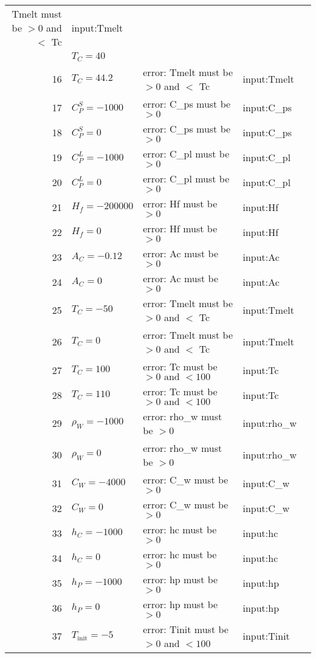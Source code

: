 \documentclass[12pt]{article}
\begin{document}
\begin{center}
\begin{longtable}{ | r | p{4cm} | p{4cm} | p{4cm} | p{4cm} |}
{{	Tmelt must be $> 0$ and $<$ Tc}} & input:Tmelt \\
	& $T_C = 40$ & & \\ \hline
	16 & $T_C = 44.2$ & error: Tmelt must be $> 0$ and $<$ Tc & input:Tmelt \\ \hline
	17 & $C^S_P = -1000$ & error: C\_ps must be $> 0$ &input:C\_{ps} \\ \hline
	18 & $C^S_P = 0$ & error: C\_ps must be $> 0$ &input:C\_{ps} \\ \hline
	19 & $C^L_P = -1000$ & error: C\_pl must be $> 0$ &input:C\_{pl} \\ \hline
	20 & $C^L_P = 0$ & error: C\_pl must be $> 0$ &input:C\_{pl} \\ \hline
	21 & $H_f = -200000$& error: Hf must be $> 0$ & input:Hf \\ \hline
	22 & $H_f = 0$ & error: Hf must be $> 0$ & input:Hf \\ \hline
	23 & $A_C = -0.12$ & error: Ac must be $> 0$ &input:Ac \\ \hline
	24 & $A_C = 0$ & error: Ac must be $> 0$ &input:Ac \\ \hline
	25 & $T_C = -50$ & error: Tmelt must
	 be $> 0$ and $<$ Tc &input:Tmelt \\ \hline
	26 & $T_C = 0$ & error: Tmelt must
	 be $> 0$ and $<$ Tc &input:Tmelt \\ \hline
	27 & $T_C = 100$ & error: Tc must be $> 0 \text{ and } < 100$ &input:Tc \\ \hline
	28 & $T_C = 110$ & error: Tc must be $> 0 \text{ and } < 100$ &input:Tc \\ \hline
	29 & $\rho_W = -1000$ & error: rho\_w must be $> 0$ &input:rho\_{w} \\ \hline
	30 & $\rho_W = 0$ & error: rho\_w must be $> 0$ &input:rho\_{w} \\ \hline
	31 & $C_W = -4000$ & error: C\_w must be $> 0$ &input:C\_{w} \\ \hline
	32 & $C_W = 0$ & error: C\_w must be $> 0$ &input:C\_{w} \\ \hline
	33 & $h_C = -1000$ & error: hc must be $> 0$ &input:hc \\ \hline
	34 & $h_C = 0$ & error: hc must be $> 0$ &input:hc \\ \hline
	35 & $h_P = -1000$ & error: hp must be $> 0$ &input:hp \\ \hline
	36 & $h_P = 0$ & error: hp must be $> 0$ &input:hp \\ \hline
	37 & $T_{\text{init}} = -5$ & error: Tinit must be $> 0$ and $< 100$ &input:Tinit \\ \hline

\end{longtable}
\end{center}
\end{document}
